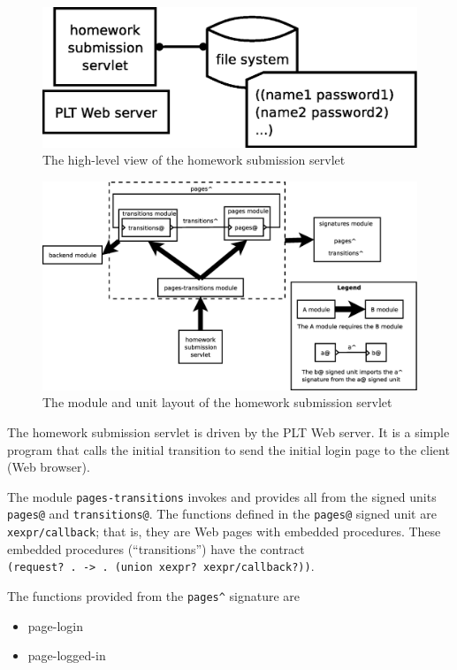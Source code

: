 \documentclass{article}
\begin{document}
\begin{figure}[h]
\centering
\includegraphics[scale=.35]{architecture.eps}
\caption{The high-level view of the homework submission servlet}
\label{fig:architecture}
\end{figure}

\begin{figure}[h]
\centering
\includegraphics[scale=.35]{design.eps}
\caption{The module and unit layout of the homework submission servlet}
\label{fig:layout}
\end{figure}

The homework submission servlet is driven by the PLT Web server. It is a simple
program that calls the initial transition to send the initial login page to
the client (Web browser).

The module \verb|pages-transitions| invokes and provides all from the signed
units \verb|pages@| and \verb|transitions@|. The functions defined in the
\verb|pages@| signed unit are \verb|xexpr/callback|; that is, they are Web
pages with embedded procedures. These embedded procedures (``transitions'')
have the contract\\
\verb|(request? . -> . (union xexpr? xexpr/callback?))|.

The functions provided from the \verb|pages^| signature are
\begin{itemize}
\item{page-login}
\item{page-logged-in}
\end{itemize}
\end{document}
